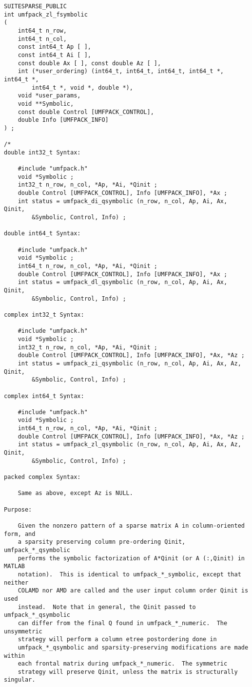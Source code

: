 \documentclass[11pt]{article}
\begin{document}
{\begin{verbatim}
SUITESPARSE_PUBLIC
int umfpack_zl_fsymbolic
(
    int64_t n_row,
    int64_t n_col,
    const int64_t Ap [ ],
    const int64_t Ai [ ],
    const double Ax [ ], const double Az [ ],
    int (*user_ordering) (int64_t, int64_t, int64_t, int64_t *, int64_t *,
        int64_t *, void *, double *),
    void *user_params,
    void **Symbolic,
    const double Control [UMFPACK_CONTROL],
    double Info [UMFPACK_INFO]
) ;

/*
double int32_t Syntax:

    #include "umfpack.h"
    void *Symbolic ;
    int32_t n_row, n_col, *Ap, *Ai, *Qinit ;
    double Control [UMFPACK_CONTROL], Info [UMFPACK_INFO], *Ax ;
    int status = umfpack_di_qsymbolic (n_row, n_col, Ap, Ai, Ax, Qinit,
        &Symbolic, Control, Info) ;

double int64_t Syntax:

    #include "umfpack.h"
    void *Symbolic ;
    int64_t n_row, n_col, *Ap, *Ai, *Qinit ;
    double Control [UMFPACK_CONTROL], Info [UMFPACK_INFO], *Ax ;
    int status = umfpack_dl_qsymbolic (n_row, n_col, Ap, Ai, Ax, Qinit,
        &Symbolic, Control, Info) ;

complex int32_t Syntax:

    #include "umfpack.h"
    void *Symbolic ;
    int32_t n_row, n_col, *Ap, *Ai, *Qinit ;
    double Control [UMFPACK_CONTROL], Info [UMFPACK_INFO], *Ax, *Az ;
    int status = umfpack_zi_qsymbolic (n_row, n_col, Ap, Ai, Ax, Az, Qinit,
        &Symbolic, Control, Info) ;

complex int64_t Syntax:

    #include "umfpack.h"
    void *Symbolic ;
    int64_t n_row, n_col, *Ap, *Ai, *Qinit ;
    double Control [UMFPACK_CONTROL], Info [UMFPACK_INFO], *Ax, *Az ;
    int status = umfpack_zl_qsymbolic (n_row, n_col, Ap, Ai, Ax, Az, Qinit,
        &Symbolic, Control, Info) ;

packed complex Syntax:

    Same as above, except Az is NULL.

Purpose:

    Given the nonzero pattern of a sparse matrix A in column-oriented form, and
    a sparsity preserving column pre-ordering Qinit, umfpack_*_qsymbolic
    performs the symbolic factorization of A*Qinit (or A (:,Qinit) in MATLAB
    notation).  This is identical to umfpack_*_symbolic, except that neither
    COLAMD nor AMD are called and the user input column order Qinit is used
    instead.  Note that in general, the Qinit passed to umfpack_*_qsymbolic
    can differ from the final Q found in umfpack_*_numeric.  The unsymmetric
    strategy will perform a column etree postordering done in
    umfpack_*_qsymbolic and sparsity-preserving modifications are made within
    each frontal matrix during umfpack_*_numeric.  The symmetric
    strategy will preserve Qinit, unless the matrix is structurally singular.


\end{verbatim}}
\end{document}
